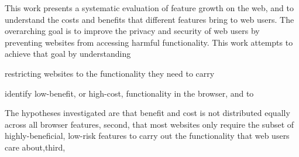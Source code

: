 This work presents a systematic evaluation of feature growth on the web, and
to understand the costs and benefits that different features bring to web users.
The overarching goal is to improve the privacy and security of web users
by preventing websites from accessing harmful functionality.  This
work attempts to achieve that goal by understanding

restricting websites to the functionality they need to carry

identify low-benefit, or high-cost, functionality in
the browser, and to

The hypotheses
investigated are that benefit and cost is not distributed equally
across all browser features, second, that most websites only require the
subset of highly-beneficial, low-risk features to carry out the functionality that
web users care about,third,





